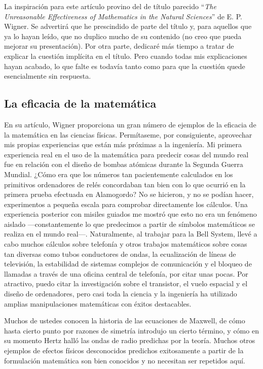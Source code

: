 \documentclass[a4paper, 12pt]{article}
\begin{document}
 

La inspiración para este artículo provino del de título parecido ``{\it The Unreasonable Effectiveness of Mathematics in the Natural Sciences}''  de E. P. Wigner. Se advertirá que he prescindido de parte del título y, para aquellos que ya lo hayan leído, que no duplico mucho de su contenido (no creo que pueda mejorar su presentación). Por otra parte, dedicaré más tiempo a tratar de explicar la cuestión implícita en el título. Pero cuando todas mis explicaciones hayan acabado, lo que falte es todavía tanto como para que la cuestión quede esencialmente sin respuesta.

 

\subsection*{La eficacia de la matemática}

 En su artículo, Wigner proporciona un gran número de ejemplos de la eficacia de la matemática en las ciencias físicas. Permítaseme, por consiguiente, aprovechar mis propias experiencias que están más próximas a la ingeniería. Mi primera experiencia real en el uso de la matemática para predecir cosas del mundo real fue en relación con el diseño de bombas atómicas durante la Segunda Guerra Mundial. ¿Cómo era que los números tan pacientemente calculados en los primitivos ordenadores de relés concordaban tan bien con lo que ocurrió en la primera prueba efectuada en Alamogordo? No se hicieron, y no se podían hacer, experimentos a pequeña escala para comprobar directamente los cálculos. Una experiencia posterior con misiles guiados me mostró que esto no era un fenómeno aislado ---constantemente lo que predecimos a partir de símbolos matemáticos se realiza en el mundo real---. Naturalmente, al trabajar para la Bell System, llevé a cabo muchos cálculos sobre telefonía y otros trabajos matemáticos sobre cosas tan diversas como tubos conductores de ondas, la ecualización de líneas de televisión, la estabilidad de sistemas complejos de comunicación y el bloqueo de llamadas a través de una oficina central de telefonía, por citar unas pocas. Por atractivo, puedo citar la investigación sobre el transistor, el vuelo espacial y el diseño de ordenadores, pero casi toda la ciencia y la  ingeniería ha utilizado amplias manipulaciones matemáticas con éxitos destacables.

 

Muchos de ustedes conocen la historia de las ecuaciones de Maxwell, de cómo hasta cierto punto por razones de simetría introdujo un cierto término, y cómo en su momento Hertz halló las ondas de radio predichas por la teoría. Muchos otros ejemplos de efectos físicos desconocidos predichos exitosamente a partir de la formulación matemática son bien conocidos y no necesitan ser repetidos aquí.
\end{document}
